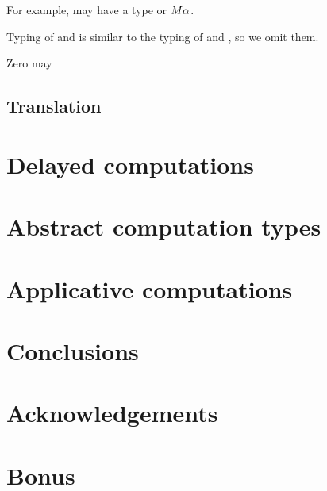 \documentclass[runningheads,a4paper]{llncs}
\begin{document}
For example,  may have a type \mtyp{\unit} or $M \alpha$.

Typing of  and  is similar to the typing of  and ,
so we omit them.

Zero may 


\subsection{Translation}
\label{sec:semantics-transl}


\section{Delayed computations}
\label{sec:delayed}


\section{Abstract computation types}
\label{sec:laws}


\section{Applicative computations}
\label{sec:applicative}


\section{Conclusions}
\label{sec:conclusions}


\section*{Acknowledgements}






\appendix

\section{Bonus}
\end{document}
